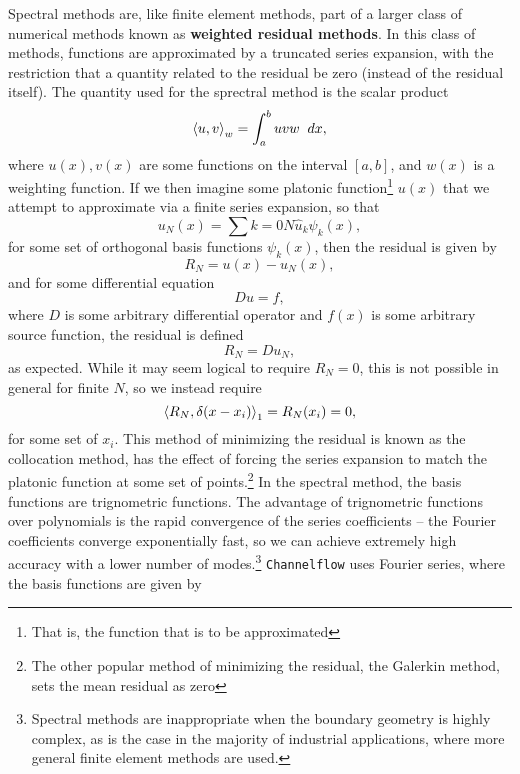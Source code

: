 Spectral methods are, like finite element methods, part of a larger class of numerical methods known as {\bf weighted residual methods}. In this class of methods, functions are approximated by a truncated series expansion, with the restriction that a quantity related to the residual be zero (instead of the residual itself). The quantity used for the sprectral method is the scalar product 
\begin{equation}\label{eq:scalarProduct}
\scprod{u}{v}{w} = \int{a}{b}{uvw}{dx},
\end{equation}
where  $u(x),v(x)$ are some functions on the interval $[a,b]$, and $w(x)$ is a weighting function. If we then imagine some platonic function\footnote{That is, the function that is to be approximated} $u(x)$ that we attempt to approximate via a finite series expansion, so that
\begin{equation}\label{eq:seriesExpansion}
u_N(x) = \sum{k=0}{N}{\hat{u}_k \psi_k(x)},
\end{equation}
for some set of orthogonal basis functions $\psi_k(x)$, then the residual is given by
\begin{equation}
R_N = u(x)-u_N(x),
\end{equation} 
and for some differential equation
\begin{equation}
Du = f,
\end{equation}
where $D$ is some arbitrary differential operator and $f(x)$ is some arbitrary source function, the residual is defined
\begin{equation}
R_N = Du_N,
\end{equation}
as expected. While it may seem logical to require $R_N = 0$, this is not possible in general for finite $N$, so we instead require 
\begin{equation}
\left < R_N,\delta(x-x_i) \right >_{1} = R_N(x_i) = 0,
\end{equation}
for some set of $x_i$. This method of minimizing the residual is known as the collocation method, has the effect of forcing the series expansion to match the platonic function at some set of points.\footnote{The other popular method of minimizing the residual, the Galerkin method, sets the mean residual as zero} In the spectral method, the basis functions are trignometric functions. The advantage of trignometric functions over polynomials is the rapid convergence of the series coefficients -- the Fourier coefficients converge exponentially fast, so we can achieve extremely high accuracy with a lower number of modes.\footnote{Spectral methods are inappropriate when the boundary geometry is highly complex, as is the case in the majority of industrial applications, where more general finite element methods are used.} {\tt Channelflow} uses Fourier series, where the basis functions are given by 
